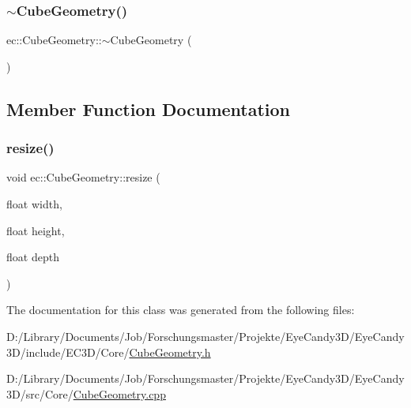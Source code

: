 \mbox{\label{classec_1_1_cube_geometry_a8e8e46246b76cdf551d59d3f5c32d88d}} 
\subsubsection{\texorpdfstring{$\sim$\+Cube\+Geometry()}{~CubeGeometry()}}
{\footnotesize\ttfamily ec\+::\+Cube\+Geometry\+::$\sim$\+Cube\+Geometry (\begin{DoxyParamCaption}{ }\end{DoxyParamCaption})\hspace{0.3cm}{\ttfamily [default]}}



\subsection{Member Function Documentation}
\mbox{\label{classec_1_1_cube_geometry_a627e0b292fee9b9c746c4ac221d167b6}} 
\subsubsection{\texorpdfstring{resize()}{resize()}}
{\footnotesize\ttfamily void ec\+::\+Cube\+Geometry\+::resize (\begin{DoxyParamCaption}\item[{float}]{width,  }\item[{float}]{height,  }\item[{float}]{depth }\end{DoxyParamCaption})}



The documentation for this class was generated from the following files\+:\begin{DoxyCompactItemize}
\item 
D\+:/\+Library/\+Documents/\+Job/\+Forschungsmaster/\+Projekte/\+Eye\+Candy3\+D/\+Eye\+Candy3\+D/include/\+E\+C3\+D/\+Core/\mbox{\hyperlink{_cube_geometry_8h}{Cube\+Geometry.\+h}}\item 
D\+:/\+Library/\+Documents/\+Job/\+Forschungsmaster/\+Projekte/\+Eye\+Candy3\+D/\+Eye\+Candy3\+D/src/\+Core/\mbox{\hyperlink{_cube_geometry_8cpp}{Cube\+Geometry.\+cpp}}\end{DoxyCompactItemize}
